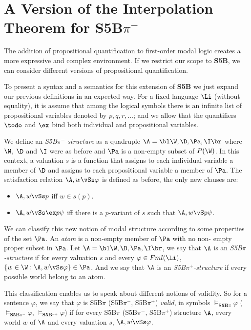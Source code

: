 \section{A Version of the Interpolation Theorem for S5B$\pi^{-}$}

\quad The addition of propositional quantification to first-order modal logic creates a more expressive and complex environment. If we restrict our scope to \textbf{S5B}, we can consider different versions of propositional quantification.

\quad To present a syntax and a semantics for this extension of \textbf{S5B} we just expand our previous definitions in an expected way. For a fixed language $\Li$ (without equality), it is assume that among the logical symbols there is an infinite list of propositional variables denoted by $p,q,r, \dots$; and we allow that the quantifiers $\todo$ and $\ex$ bind both individual and propositional variables. 

\quad We define an \textit{S5B$\pi^{-}$-structure} as a quadruple $\A = \bl \W, \D, \Pa, \I \br$ where $\W$, $\D$ and $\I$ were as before and $\Pa$ is a non-empty subset of $P(\W)$. In this context, a valuation $s$ is a function that assigns to each individual variable a member of $\D$ and assigns to each propositional variable a member of $\Pa$. The satisfaction relation $\A,w \vSs \varphi$ is defined as before, the only new clauses are:

\begin{itemize} 
\item[] $\A,w \vSs p$ iff $w \in s(p)$. 
\item[] $\A,w \vSs \ex p \psi$ iff there is a $p$-variant of $s$ such that $\A,w \vSp \psi$.
\end{itemize}


\qquad We can classify this new notion of modal structure according to some properties of the set $\Pa$. An \textit{atom} is a non-empty member of $\Pa$ with no non- empty proper subset in $\Pa$. Let $\A = \bl \W, \D, \Pa, \I \br$, we say that $\A$ is an \textit{S5B$\pi$ -structure} if for every valuation $s$ and every $\varphi \in Fml(\Li)$, $\{w \in \W: \A,w \vSs \varphi \}\in \Pa$. And we say that $\A$ is an \textit{S5B$\pi^{+}$-structure} if every possible world belong to an atom. 


\qquad This classification enables us to speak about different notions of validity. So for a sentence $\varphi$, we say that $\varphi$ is S5B$\pi$ (S5B$\pi^{-}$, S5B$\pi^{+}$) \textit{valid}, in symbols $\models_{\textbf{S5B}\pi}\varphi$ ($\models_{\textbf{S5B}\pi^{-}}\varphi$, $\models_{\textbf{S5B}\pi^{+}}\varphi$) if for every S5B$\pi$ (S5B$\pi^{-}$, S5B$\pi^{+}$) structure $\A$, every world $w$ of $\A$ and every valuation $s$, $\A,w \vSs \varphi$. 

